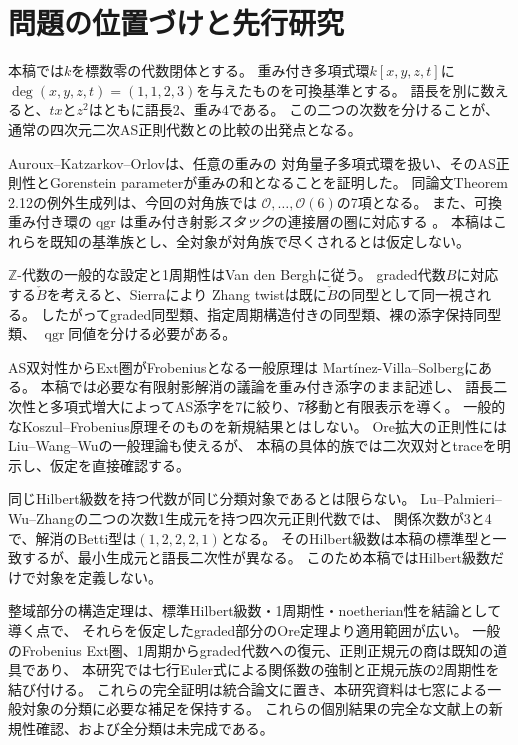 \documentclass[11pt,a4paper]{ltjsarticle}
\theoremstyle{definition}
\newcommand{\ZZ}{\mathbb Z}
\newcommand{\qgr}{\operatorname{qgr}}
\begin{document}
\section{問題の位置づけと先行研究}
本稿では$k$を標数零の代数閉体とする。
重み付き多項式環$k[x,y,z,t]$に
$\deg(x,y,z,t)=(1,1,2,3)$を与えたものを可換基準とする。
語長を別に数えると、$tx$と$z^2$はともに語長2、重み4である。
この二つの次数を分けることが、通常の四次元二次AS正則代数との比較の出発点となる。

Auroux--Katzarkov--Orlov\cite[\S2, Proposition 2.6]{AKO}は、任意の重みの
対角量子多項式環を扱い、そのAS正則性とGorenstein parameterが重みの和となることを証明した。
同論文Theorem 2.12の例外生成列は、今回の対角族では
$\mathcal O,\ldots,\mathcal O(6)$の7項となる。
また、可換重み付き環の$\qgr$は重み付き射影\emph{スタック}の連接層の圏に対応する
\cite[Proposition 2.3, Corollary 2.4]{AKO}。
本稿はこれらを既知の基準族とし、全対象が対角族で尽くされるとは仮定しない。

$\ZZ$-代数の一般的な設定と1周期性はVan den Bergh\cite[\S3--4]{VdB}に従う。
graded代数$B$に対応する$\check B$を考えると、Sierra\cite[Theorem 1.2]{Sierra}により
Zhang twistは既に$\check B$の同型として同一視される。
したがってgraded同型類、指定周期構造付きの同型類、裸の添字保持同型類、
$\qgr$同値を分ける必要がある。

AS双対性からExt圏がFrobeniusとなる一般原理は
Mart\'inez-Villa--Solberg\cite[Lemma 6.1(b), Theorem 6.2]{MVS}にある。
本稿では必要な有限射影解消の議論を重み付き添字のまま記述し、
語長二次性と多項式増大によってAS添字を7に絞り、7移動と有限表示を導く。
一般的なKoszul--Frobenius原理そのものを新規結果とはしない。
Ore拡大の正則性にはLiu--Wang--Wu\cite[Theorem 3.3]{LWW}の一般理論も使えるが、
本稿の具体的族では二次双対とtraceを明示し、仮定を直接確認する。

同じHilbert級数を持つ代数が同じ分類対象であるとは限らない。
Lu--Palmieri--Wu--Zhang\cite{LPWZ}の二つの次数1生成元を持つ四次元正則代数では、
関係次数が3と4で、解消のBetti型は$(1,2,2,2,1)$となる。
そのHilbert級数は本稿の標準型と一致するが、最小生成元と語長二次性が異なる。
このため本稿ではHilbert級数だけで対象を定義しない。

整域部分の構造定理は、標準Hilbert級数・1周期性・noetherian性を結論として導く点で、
それらを仮定したgraded部分のOre定理より適用範囲が広い。
一般のFrobenius Ext圏、1周期からgraded代数への復元、正則正規元の商は既知の道具であり、
本研究では七行Euler式による関係数の強制と正規元族の2周期性を結び付ける。
これらの完全証明は統合論文に置き、本研究資料は七窓による一般対象の分類に必要な補足を保持する。
これらの個別結果の完全な文献上の新規性確認、および全分類は未完成である。
\end{document}
